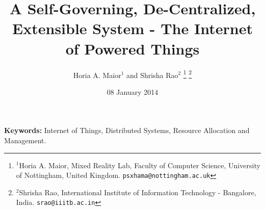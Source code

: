 \documentclass[letterpaper, 10 pt, conference]{ieeeconf}
\title{A Self-Governing, De-Centralized, Extensible System - The Internet of Powered Things}
\author{Horia A. Maior$^{1}$ and Shrisha Rao$^{2}$%
\thanks{$^{1}$Horia A. Maior, Mixed Reality Lab, Faculty of Computer Science, University of Nottingham, United Kingdom.
        {\tt\small psxhama@nottingham.ac.uk}}%
\thanks{$^{2}$Shrisha Rao, International Institute of Information Technology - Bangalore, India.
        {\tt\small srao@iiitb.ac.in}}%
}
\begin{document}
\maketitle
\thispagestyle{empty}
\pagestyle{empty}




\date{08 January 2014}




{\bf Keywords:} Internet of Things, Distributed Systems, Resource Allocation and Management.






%



\end{document}
